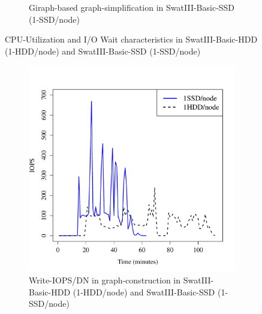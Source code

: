 \documentclass[conference]{IEEEtran}
\begin{document}
\begin{figure}[htb]
\begin{subfigure}[b]{0.23\textwidth}
                \caption{Giraph-based graph-simplification in SwatIII-Basic-SSD (1-SSD/node)}
                \label{fig:ECCPUSSD}
        \end{subfigure}
        \caption{CPU-Utilization and I/O Wait characteristics in SwatIII-Basic-HDD (1-HDD/node) and SwatIII-Basic-SSD (1-SSD/node)}\label{fig:HddSsdCPU}
        \vspace{-1.5em}
\end{figure}

\begin{figure}[htb]   
        \begin{subfigure}[b]{0.23\textwidth}
                \includegraphics[width=\textwidth]{Figure/SystemData/Plots/BGHddSsdWrIops.pdf}
                \caption{Write-IOPS/DN in graph-construction in SwatIII-Basic-HDD (1-HDD/node) and SwatIII-Basic-SSD (1-SSD/node)}
                \label{fig:BGHddSsdWrIops}
        \end{subfigure}
        \begin{subfigure}[b]{0.23\textwidth}

\end{subfigure}
\end{figure}
\end{document}
